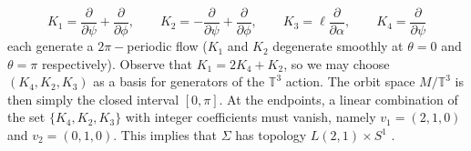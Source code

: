 \documentclass[11pt]{amsart}
\theoremstyle{plain}
\theoremstyle{definition}
\numberwithin{equation}{section}
\begin{document}
\begin{equation}
    K_1 = \frac{\partial}{\partial \psi} + \frac{\partial}{\partial \phi}, \qquad K_2 = -\frac{\partial}{\partial \psi} + \frac{\partial}{\partial \phi} , \qquad K_3 = \ell \frac{\partial}{\partial \alpha} , \qquad K_4 = \frac{\partial}{\partial \psi}
\end{equation} each generate a $2\pi-$periodic flow ($K_1$ and $K_2$ degenerate smoothly at $\theta =0$ and $\theta = \pi$ respectively).  Observe that $K_1 = 2K_4 + K_2$, so we may choose $(K_4,K_2,K_3)$ as a basis for generators of the $\mathbb{T}^3$ action. The orbit space $M / \mathbb{T}^3$ is then simply the closed interval $[0,\pi]$. At the endpoints, a linear combination of the set $\{K_4,K_2,K_3\}$ with integer coefficients must vanish, namely $v_1 = (2,1,0)$ and $v_2 = (0,1,0)$. This implies that $\Sigma$ has topology $L(2,1) \times S^1$ \cite{Hollands}.
\end{document}
